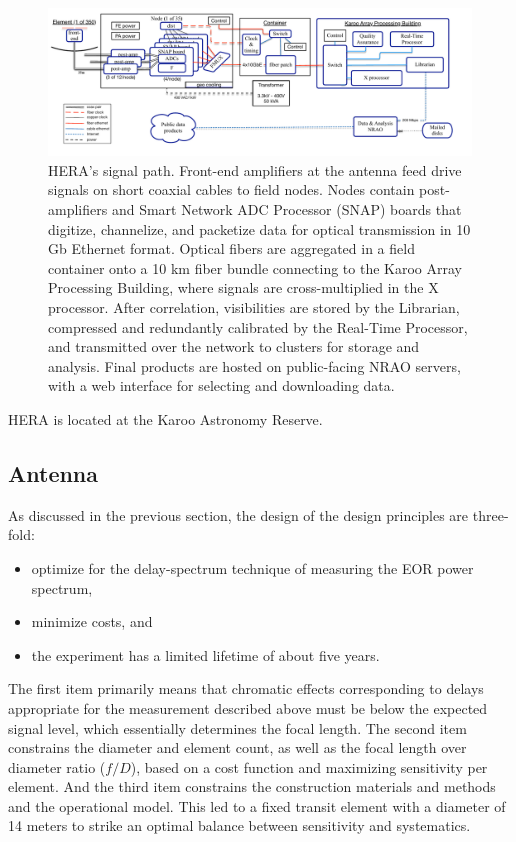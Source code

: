 \documentclass[preprint,11pt]{aastex}
\begin{document}
\begin{figure}[h]
	\centering
	\includegraphics[width=1\textwidth]{plots/HERA_high_level_block_diagram.pdf}
	\caption{HERA's signal path.  Front-end amplifiers at the antenna feed drive signals on short coaxial cables to 
field nodes.  Nodes contain post-amplifiers and Smart Network ADC Processor (SNAP) boards that digitize, channelize,
and packetize data for optical transmission in 10 Gb Ethernet format.  Optical fibers are aggregated in a field container
onto a 10 km fiber bundle connecting to the Karoo Array Processing Building, where signals are cross-multiplied
in the X processor.  After correlation, visibilities are stored by the Librarian, compressed and redundantly calibrated
by the Real-Time Processor, and transmitted over the network to clusters for storage and analysis.  Final products are
hosted on public-facing NRAO servers, with a web interface for selecting and downloading data.}
	\label{fig:overallBlockDiagram}
	\vspace{-5pt}
\end{figure}

HERA is located at the Karoo Astronomy Reserve.

\subsection{Antenna}
\label{sec:antenna}

As discussed in the previous section, the design of the design principles are three-fold:
\begin{itemize}
\item optimize for the delay-spectrum technique of measuring the EOR power spectrum,
\item minimize costs, and
\item the experiment has a limited lifetime of about five years.
\end{itemize}
The first item primarily means that chromatic effects corresponding to delays appropriate for the measurement described above must be below the expected signal level, which essentially determines the focal length.  The second item constrains the diameter and element count, as well as the focal length over diameter ratio ($f/D$), based on a cost function and maximizing sensitivity per element.  And the third item constrains the construction materials and methods and the operational model.  This led to a fixed transit element with a diameter of 14 meters to strike an optimal balance between sensitivity and systematics.
\end{document}
